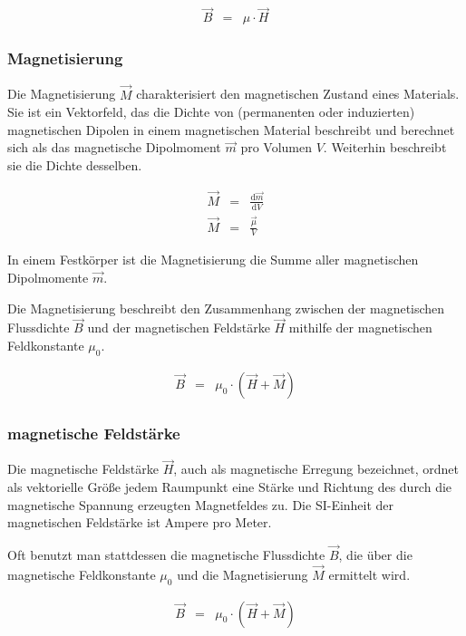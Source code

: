 \documentclass[12pt,a4paper]{scrartcl}
\numberwithin{equation}{section} %
\begin{document}
\begin{eqnarray}
    \vec B &=& \mu \cdot \vec H
\end{eqnarray}

\hypertarget{magnetisierung}{%
\subsubsection{Magnetisierung}\label{magnetisierung}}

Die Magnetisierung $\vec M$ charakterisiert den magnetischen Zustand
eines Materials. Sie ist ein Vektorfeld, das die Dichte von (permanenten
oder induzierten) magnetischen Dipolen in einem magnetischen Material
beschreibt und berechnet sich als das magnetische Dipolmoment $\vec m$
pro Volumen $V$. Weiterhin beschreibt sie die Dichte desselben.

\begin{eqnarray}
    \vec M &=& \frac{\mathrm d\vec m}{\mathrm dV} \\
    \vec M &=& \frac{\vec \mu}{V}
\end{eqnarray}

In einem Festkörper ist die Magnetisierung die Summe aller magnetischen
Dipolmomente $\vec m$.

Die Magnetisierung beschreibt den Zusammenhang zwischen der magnetischen
Flussdichte $\vec B$ und der magnetischen Feldstärke $\vec H$
mithilfe der magnetischen Feldkonstante $\mu_0$.

\begin{eqnarray}
 \vec B &=& \mu_0 \cdot \left(\vec H + \vec M\right)
\end{eqnarray}

\hypertarget{magnetische-feldstuxe4rke}{%
\subsubsection{magnetische Feldstärke}\label{magnetische-feldstuxe4rke}}

Die magnetische Feldstärke $\vec H$, auch als magnetische Erregung
bezeichnet, ordnet als vektorielle Größe jedem Raumpunkt eine Stärke und
Richtung des durch die magnetische Spannung erzeugten Magnetfeldes zu.
Die SI-Einheit der magnetischen Feldstärke ist Ampere pro Meter.

Oft benutzt man stattdessen die magnetische Flussdichte $\vec B$, die
über die magnetische Feldkonstante $\mu_0$ und die Magnetisierung
$\vec M$ ermittelt wird.

\begin{eqnarray}
    \vec B &=& \mu_0 \cdot \left(\vec H + \vec M\right)
\end{eqnarray}
\end{document}
